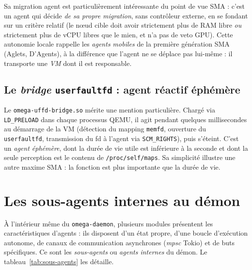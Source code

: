 Sa migration agent est particulièrement intéressante du point de vue SMA : c'est un agent qui décide \emph{de sa propre migration}, sans contrôleur externe, en se fondant sur un critère relatif (\og{}le nœud cible doit avoir strictement plus de RAM libre \emph{ou} strictement plus de vCPU libres que le mien, et n'a pas de veto GPU\fg{}). Cette autonomie locale rappelle les \emph{agents mobiles} de la première génération SMA (Aglets, D'Agents), à la différence que l'agent ne se déplace pas lui-même : il transporte une \emph{VM} dont il est responsable.

\subsection{Le \emph{bridge} \texttt{userfaultfd} : agent réactif éphémère}

Le \texttt{omega-uffd-bridge.so} mérite une mention particulière. Chargé via \texttt{LD\_PRELOAD} dans chaque processus QEMU, il agit pendant quelques millisecondes au démarrage de la VM (détection du mapping \texttt{memfd}, ouverture du \texttt{userfaultfd}, transmission du fd à l'agent via \texttt{SCM\_RIGHTS}), puis s'éteint. C'est un \emph{agent éphémère}, dont la durée de vie utile est inférieure à la seconde et dont la seule perception est le contenu de \texttt{/proc/self/maps}. Sa simplicité illustre une autre maxime SMA : la fonction est plus importante que la durée de vie.

\section{Les sous-agents internes au démon}
\label{sec:sma-sousagents}

À l'intérieur même du \texttt{omega-daemon}, plusieurs modules présentent les caractéristiques d'agents : ils disposent d'un état propre, d'une boucle d'exécution autonome, de canaux de communication asynchrones (\emph{mpsc} Tokio) et de buts spécifiques. Ce sont les \emph{sous-agents} ou \emph{agents internes} du démon. Le tableau~\ref{tab:sous-agents} les détaille.

